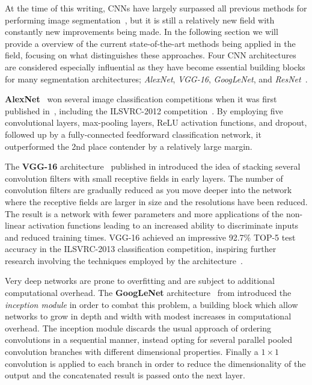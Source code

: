 At the time of this writing, CNNs have largely surpassed all previous methods for performing image segmentation~\cite{segmentation-overview}, but it is still a relatively new field with constantly new improvements being made.
In the following section we will provide a overview of the current state-of-the-art methods being applied in the field, focusing on what distinguishes these approaches.
Four CNN architectures are considered especially influential as they have become essential building blocks for many segmentation architectures; \textit{AlexNet}, \textit{VGG-16}, \textit{GoogLeNet}, and \textit{ResNet}~\cite{segmentation-overview}.

\textbf{AlexNet}~\cite{segmentation-alexnet} won several image classification competitions when it was first published in~\citeyear{segmentation-alexnet}, including the ILSVRC-2012 competition~\cite{segmentation-overview}.
By employing five convolutional layers, max-pooling layers, ReLU activation functions, and dropout, followed up by a fully-connected feedforward classification network, it outperformed the 2nd place contender by a relatively large margin.

The \textbf{VGG-16} architecture~\cite{vgg-16} published in \citeyear{vgg-16} introduced the idea of stacking several convolution filters with small receptive fields in early layers.
The number of convolution filters are gradually reduced as you move deeper into the network where the receptive fields are larger in size and the resolutions have been reduced.
The result is a network with fewer parameters and more applications of the non-linear activation functions leading to an increased ability to discriminate inputs and reduced training times.
VGG-16 achieved an impressive 92.7\% TOP-5 test accuracy in the ILSVRC-2013 classification competition, inspiring further research involving the techniques employed by the architecture~\cite{segmentation-overview}.

Very deep networks are prone to overfitting and are subject to additional computational overhead.
The \textbf{GoogLeNet} architecture~\cite{googlenet} from \citeyear{googlenet} introduced the \textit{inception module} in order to combat this problem, a building block which allow networks to grow in depth and width with modest increases in computational overhead.
The inception module discards the usual approach of ordering convolutions in a sequential manner, instead opting for several parallel pooled convolution branches with different dimensional properties.
Finally a $1 \times 1$ convolution is applied to each branch in order to reduce the dimensionality of the output and the concatenated result is passed onto the next layer.

